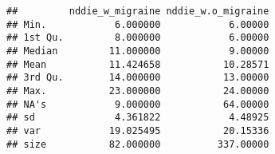 \documentclass[]{article}
\newenvironment{Shaded}{\begin{snugshade}}{\end{snugshade}}
\newcommand{\KeywordTok}[1]{\textcolor[rgb]{0.13,0.29,0.53}{\textbf{#1}}}
\newcommand{\DecValTok}[1]{\textcolor[rgb]{0.00,0.00,0.81}{#1}}
\newcommand{\StringTok}[1]{\textcolor[rgb]{0.31,0.60,0.02}{#1}}
\newcommand{\OperatorTok}[1]{\textcolor[rgb]{0.81,0.36,0.00}{\textbf{#1}}}
\newcommand{\NormalTok}[1]{#1}
\begin{document}
\begin{Shaded}
\end{Shaded}

\begin{verbatim}
##         nddie_w_migraine nddie_w.o_migraine
## Min.            6.000000            6.00000
## 1st Qu.         8.000000            6.00000
## Median         11.000000            9.00000
## Mean           11.424658           10.28571
## 3rd Qu.        14.000000           13.00000
## Max.           23.000000           24.00000
## NA's            9.000000           64.00000
## sd              4.361822            4.48925
## var            19.025495           20.15336
## size           82.000000          337.00000
\end{verbatim}
\end{document}
